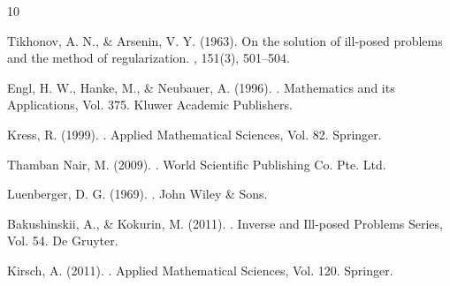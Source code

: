 \documentclass[12pt]{article}
\begin{document}
	\begin{thebibliography}{10}
		
		Tikhonov, A. N., \& Arsenin, V. Y. (1963).
		\newblock On the solution of ill-posed problems and the method of regularization.
		, 151(3), 501--504.
		
		Engl, H. W., Hanke, M., \& Neubauer, A. (1996).
		.
		\newblock Mathematics and its Applications, Vol. 375. Kluwer Academic Publishers.
		
		Kress, R. (1999).
		.
		\newblock Applied Mathematical Sciences, Vol. 82. Springer.
		
		Thamban Nair, M. (2009).
		.
		\newblock World Scientific Publishing Co. Pte. Ltd.
		
		Luenberger, D. G. (1969).
		.
		\newblock John Wiley \& Sons.
		
		Bakushinskii, A., \& Kokurin, M. (2011).
		.
		\newblock Inverse and Ill-posed Problems Series, Vol. 54. De Gruyter.
		
		Kirsch, A. (2011).
		.
		\newblock Applied Mathematical Sciences, Vol. 120. Springer.
		
	\end{thebibliography}
	
\end{document}
